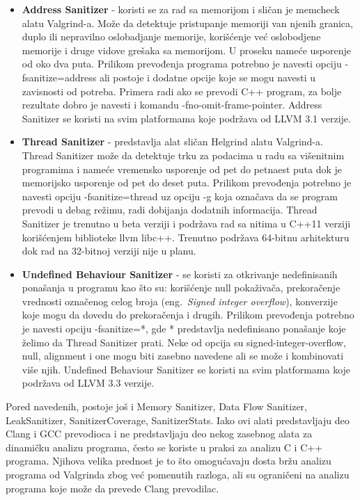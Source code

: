 \documentclass[a4paper]{article}
\begin{document}
\begin{itemize}
    \item \textbf{Address Sanitizer} - koristi se za rad sa memorijom i sličan je memcheck alatu Valgrind-a. Može da detektuje pristupanje memoriji van njenih granica, duplo ili nepravilno oslobadjanje memorije, korišćenje već oslobodjene memorije i druge vidove grešaka sa memorijom. U proseku nameće usporenje od oko dva puta. Prilikom prevođenja programa potrebno je navesti opciju -fsanitize=address ali postoje i dodatne opcije koje se mogu navesti u zavisnosti od potreba. Primera radi ako se prevodi C++ program, za bolje rezultate dobro je navesti i komandu -fno-omit-frame-pointer. Address Sanitizer se koristi na svim platformama koje podržava od LLVM 3.1 verzije.
     \item \textbf{Thread Sanitizer} - predstavlja alat sličan Helgrind alatu Valgrind-a. Thread Sanitizer može da detektuje trku za podacima u radu sa višenitnim programima i nameće vremensko usporenje od pet do petnaest puta dok je memorijsko usporenje od pet do deset puta. Prilikom prevođenja potrebno je navesti opciju -fsanitize=thread uz opciju -g koja označava da se program prevodi u debag režimu, radi dobijanja dodatnih informacija. Thread Sanitizer je trenutno u beta verziji i podržava rad sa nitima u C++11 verziji korišćenjem biblioteke llvm libc++. Trenutno podržava 64-bitnu arhitekturu dok rad na 32-bitnoj verziji nije u planu.
     \item \textbf{Undefined Behaviour Sanitizer} - se koristi za otkrivanje nedefinisanih ponašanja u programu kao što su: korišćenje null pokaživača, prekoračenje vrednosti označenog celog broja (eng.~{\em Signed integer overflow}), konverzije koje mogu da dovedu do prekoračenja i drugih. Prilikom prevođenja potrebno je navesti opciju -fsanitize=*, gde * predstavlja nedefinisano ponašanje koje želimo da Thread Sanitizer prati. Neke od opcija su signed-integer-overflow, null, alignment i one mogu biti zasebno navedene ali se može i kombinovati više njih. Undefined Behaviour Sanitizer se koristi na svim platformama koje podržava od LLVM 3.3 verzije.
\end{itemize}

Pored navedenih, postoje još i Memory Sanitizer, Data Flow Sanitizer, LeakSanitizer, SanitizerCoverage, SanitizerStats. Iako ovi alati predstavljaju deo Clang i GCC prevodioca i ne predstavljaju deo nekog zasebnog alata za dinamičku analizu programa, često se koriste u praksi za analizu C i C++ programa. Njihova velika prednost je to što omogućavaju dosta bržu analizu programa od Valgrinda zbog već pomenutih razloga, ali su ograničeni na analizu programa koje može da prevede Clang prevodilac. \cite{clang-doc} 
\end{document}
